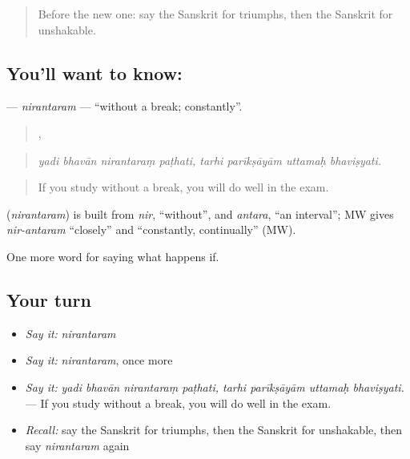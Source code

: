 \label{lesson:SA-C393-nirantaram}



\begin{quote}
Before the new one: say the Sanskrit for triumphs, then the Sanskrit for unshakable.
\end{quote}

\subsection*{You'll want to know: }
\textbf{} — \emph{nirantaram} — \textquotedblleft{}without a break; constantly\textquotedblright{}.

\begin{quote}
   ,    
\end{quote}

\begin{quote}
\emph{yadi bhavān nirantaraṃ paṭhati, tarhi parīkṣāyām uttamaḥ bhaviṣyati.}
\end{quote}

\begin{quote}
If you study without a break, you will do well in the exam.
\end{quote}

\begin{cousinweb}
\textbf{} (\emph{nirantaram}) is built from \emph{nir}, \textquotedblleft{}without\textquotedblright{}, and \emph{antara}, \textquotedblleft{}an interval\textquotedblright{}; MW gives \emph{nir-antaram} \textquotedblleft{}closely\textquotedblright{} and \textquotedblleft{}constantly, continually\textquotedblright{} (MW).
\end{cousinweb}

\begin{grammarlens}[title={What you've built}]
One more word for saying what happens if.
\end{grammarlens}

\subsection*{Your turn}
\begin{itemize}
\raggedright
  \item \emph{Say it:} \emph{nirantaram}
  \item \emph{Say it:} \emph{nirantaram}, once more
  \item \emph{Say it:} \emph{yadi bhavān nirantaraṃ paṭhati, tarhi parīkṣāyām uttamaḥ bhaviṣyati.} — If you study without a break, you will do well in the exam.
  \item \emph{Recall:} say the Sanskrit for triumphs, then the Sanskrit for unshakable, then say \emph{nirantaram} again
\end{itemize}


